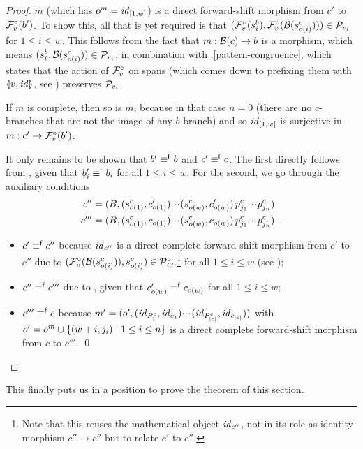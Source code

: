 \begin{proof}
\smallskip
$\bar m$ (which has $o^{\bar m}=\mathit{id}_{[1,w]}$) is a direct forward-shift morphism from $c'$ to $\mathcal{F}^\circ_{v}(b')$. To show this, all that is yet required is that $(\mathcal{F}^\circ_{v}(s^b_i),\mathcal{F}^\circ_{v}(\mathcal{B}(s^c_{o(i)}))) \in \mathcal{P}_{v_i}$ for $1\leq i\leq w$. This follows from the fact that $m:\mathcal{B}(c) \rightarrow b$ is a morphism, which means $(s^b_i,\mathcal{B}(s^c_{o(i)}))\in \mathcal{P}_{v_i}$, in combination with .\ref{pattern-congruence}, which states that the action of $\mathcal{F}^\circ_{v}$ on spans (which comes down to prefixing them with $\spanof{v}{\id}$, see ) preserves $\mathcal{P}_{v_i}$.

\smallskip
If $m$ is complete, then so is $\bar m$, because in that case $n=0$ (there are no $c$-branches that are not the image of any $b$-branch) and so $\mathit{id}_{[1,w]}$ is surjective in $\bar m:c' \rightarrow \mathcal{F}^\circ_{v}(b')$.

\smallskip
It only remains to be shown that $b'\equiv^{\mathsf f} b$ and $c'\equiv^{\mathsf f} c$. The first directly follows from , given that $b'_i\equiv^{\mathsf f} b_i$ for all $1\leq i\leq w$. For the second, we go through the auxiliary conditions
\begin{align*}
c''=\;&(B,(s^c_{o(1)},c'_{o(1)}){\cdotp\mkern-2mu\cdotp\mkern-2mu\cdotp\mkern1mu} (s^c_{o(w)},c'_{o(w)})\,p^c_{j_1}{\cdotp\mkern-2mu\cdotp\mkern-2mu\cdotp\mkern1mu} p^c_{j_n}) \\
c'''=\;&(B,(s^c_{o(1)},c_{o(1)}){\cdotp\mkern-2mu\cdotp\mkern-2mu\cdotp\mkern1mu} (s^c_{o(w)},c_{o(w)})\,p^c_{j_1}{\cdotp\mkern-2mu\cdotp\mkern-2mu\cdotp\mkern1mu} p^c_{j_n}) \enspace.
\end{align*}
\begin{itemize}
\item $c'\equiv^{\mathsf f} c''$ because $\mathit{id}_{c''}$ is a direct complete forward-shift morphism from $c'$ to $c''$ due to $(\mathcal{F}^\circ_{v}(\mathcal{B}(s^c_{o(i)})),s^c_{o(i)})\in \mathcal{P}^\circ_{\mathit{id}}$.\footnote{Note that this reuses the mathematical object $\mathit{id}_{c''}$, not in its role as identity morphism $c''\to c''$ but to relate $c'$ to $c''$.} for all $1\leq i\leq w$ (see );

\item $c''\equiv^{\mathsf f} c'''$ due to , given that $c'_{o(w)}\equiv^{\mathsf f} c_{o(w)}$ for all $1\leq i\leq w$; 

\item $c'''\equiv^{\mathsf f} c$ because $m'=(o',(\mathit{id}_{P^c_1},\mathit{id}_{c_1}){\cdotp\mkern-2mu\cdotp\mkern-2mu\cdotp\mkern1mu} (\mathit{id}_{P^c_{|c|}},\mathit{id}_{c_{|c|}}))$ with $o'=o^m\cup\{{(w+i,j_i) \mid 1\leq i\leq n}\}$ is a direct complete forward-shift morphism from $c$ to $c'''$.
\qed
\end{itemize}
\end{proof}
%
This finally puts us in a position to prove the theorem of this section.

